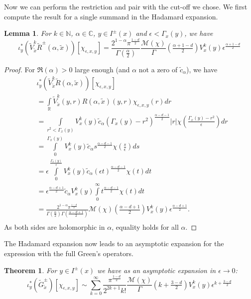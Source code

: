 \documentclass[11pt]{article}
\def\C{{\mathbb{C}}}
\def\R{{\mathbb{R}}}
\def\N{{\mathbb{N}}}
\def\insum#1{\sum\limits_{#1=0}^\infty}
\def\intR{\int\limits_\R}
\def\M{\mathcal{M}}
\newtheorem{lemma}[df]{Lemma}
\newtheorem{thm}[df]{Theorem}
\begin{document}
Now we can perform the restriction and pair with the cut-off we chose. We first compute the result for a single summand in the Hadamard expansion.
\begin{lemma}
	\label{summandev}
 For $k\in\N$, $\alpha\in \C$, $y\in I^\pm(x)$ and $\epsilon<\Gamma_x(y)$, we have 
 \[\iota_y^*(\tilde V^k_{\tilde x}\tilde R^\pm({\alpha},{\tilde x}))[\chi_{\epsilon,x,y}]=\frac{2^{1-\alpha}\pi^{\tfrac{1-d}{2}}}{\Gamma(\frac{\alpha}{2})}\frac{\M(\chi)}{\Gamma}(\tfrac{\alpha+1-d}{2})V^k_x(y)\epsilon^{\tfrac{\alpha+1-d}{2}}\]
\end{lemma}
\begin{proof}
	For $\Re(\alpha)>0$ large enough (and $\alpha$ not a zero of $\tilde c_\alpha$), we have
	\begin{align*}
		&\iota_y^*(\tilde V^k_{\tilde x}\tilde R({\alpha},{\tilde x}))[\chi_{\epsilon,x,y}]\\
		&=\intR \tilde V^k_{\tilde x}(y,r)R({\alpha},{\tilde x})(y,r)\chi_{\epsilon,x,y}(r) dr\\
		&=\int\limits_{r^2<\Gamma_x(y)} V^k_{x}(y)\tilde c_\alpha(\Gamma_x(y)-r^2)^{\tfrac{\alpha-d-1}{2}}|r|\chi\left(\frac{\Gamma_x(y)-r^2}{\epsilon}\right) dr\\
		&=\int\limits_0^{\Gamma_x(y)} V^k_{x}(y)\tilde c_\alpha s^{\tfrac{\alpha-d-1}{2}}\chi\left(\frac{s}{\epsilon}\right) ds\\
		&=\epsilon \int\limits_0^{\tfrac{\Gamma_x(y)}{\epsilon}} V^k_{x}(y)\tilde c_\alpha (\epsilon t)^{\tfrac{\alpha-d-1}{2}}\chi\left(t\right) dt\\
		&=\epsilon^{\tfrac{\alpha-d+1}{2}} \tilde c_\alpha V^k_{x}(y)\int\limits_0^{\infty}   t^{\tfrac{\alpha-d-1}{2}}\chi\left(t\right) dt\\
		&=\frac{2^{1-\alpha}\pi^{\frac{1-d}{2}}}{\Gamma(\tfrac{\alpha}{2})\Gamma(\tfrac{\alpha-d+1}{2})} \M(\chi)(\tfrac{\alpha-d+1}{2})V^k_{x}(y)\epsilon^{\tfrac{\alpha-d+1}{2}}.\\
	\end{align*}
	As both sides are holomorphic in $\alpha$, equality holds for all $\alpha$.
\end{proof}
The Hadamard expansion now leads to an asymptotic expansion for the expression with the full Green's operators.
\begin{thm}
	For $y\in I^\pm(x)$ we have as an asymptotic expansion in $\epsilon\to0$:
	\[\iota_y^*(\tilde G^\pm_{\tilde x})[\chi_{\epsilon,x,y}]\sim \insum{k}\frac{\pi^{\tfrac{1-d}{2}}}{2^{2k+1}k!}\frac{\M(\chi)}{\Gamma}(k+\tfrac{3-d}{2})V^k_x(y)\epsilon^{k+\tfrac{3-d}{2}}\]
\end{thm}
\end{document}
